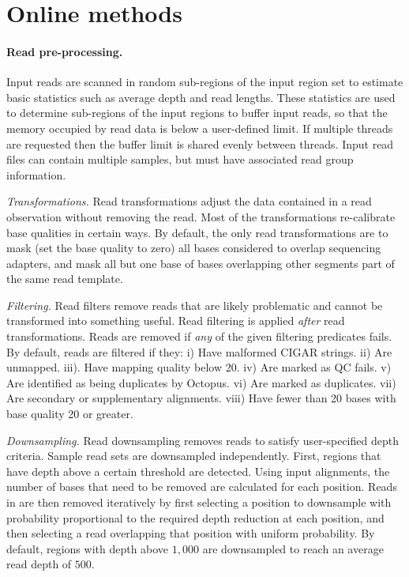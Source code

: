 \documentclass[notitlepage, twocolumn, 10pt]{article}
\begin{document}



\section*{Online methods}\small

\paragraph*{Read pre-processing.} Input reads are scanned in random sub-regions of the input region set to estimate basic statistics such as average depth and read lengths. These statistics are used to determine sub-regions of the input regions to buffer input reads, so that the memory occupied by read data is below a user-defined limit. If multiple threads are requested then the buffer limit is shared evenly between threads. Input read files can contain multiple samples, but must have associated read group information.

\vspace{3mm}
\noindent\emph{Transformations.} Read transformations adjust the data contained in a read observation without removing the read. Most of the transformations re-calibrate base qualities in certain ways. By default, the only read transformations are to mask (set the base quality to zero) all bases considered to overlap sequencing adapters, and mask all but one base of bases overlapping other segments part of the same read template.

\vspace{3mm}
\noindent\emph{Filtering.} Read filters remove reads that are likely problematic and cannot be transformed into something useful. Read filtering is applied \emph{after} read transformations. Reads are removed if \emph{any} of the given filtering predicates fails. By default, reads are filtered if they: i) Have malformed CIGAR strings. ii) Are unmapped. iii). Have mapping quality below 20. iv) Are marked as QC fails. v) Are identified as being duplicates by Octopus. vi) Are marked as duplicates. vii) Are secondary or supplementary alignments. viii) Have fewer than 20 bases with base quality 20 or greater.

\vspace{3mm}
\noindent\emph{Downsampling.} Read downsampling removes reads to satisfy user-specified depth criteria. Sample read sets are downsampled independently. First, regions that have depth above a certain threshold are detected. Using input alignments, the number of bases that need to be removed are calculated for each position. Reads in  are then removed iteratively by first selecting a position to downsample with probability proportional to the required depth reduction at each position, and then selecting a read overlapping that position with uniform probability. By default, regions with depth above $1,000$ are downsampled to reach an average read depth of $500$.
\end{document}
